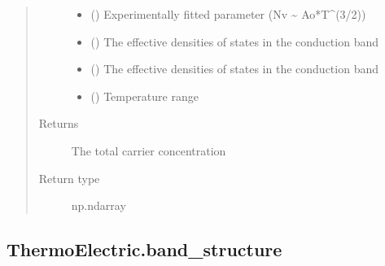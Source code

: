 \documentclass[letterpaper,10pt,english]{sphinxmanual}
\begin{document}
\begin{fulllineitems}
\begin{quote}
\begin{description}
\begin{itemize}
\item {} 
\sphinxAtStartPar
{} () \textendash{} Experimentally fitted parameter (Nv \textasciitilde{} Ao*T\textasciicircum{}(3/2))

\item {} 
\sphinxAtStartPar
{} () \textendash{} The effective densities of states in the conduction band

\item {} 
\sphinxAtStartPar
{} () \textendash{} The effective densities of states in the conduction band

\item {} 
\sphinxAtStartPar
{} () \textendash{} Temperature range

\end{itemize}

\item[{Returns}] \leavevmode
\sphinxAtStartPar
{} \textendash{} The total carrier concentration

\item[{Return type}] \leavevmode
\sphinxAtStartPar
np.ndarray

\end{description}\end{quote}

\end{fulllineitems}



\subsection{ThermoElectric.band\_structure}
\label{\detokenize{autosummary/ThermoElectric.band_structure:thermoelectric-band-structure}}\label{\detokenize{autosummary/ThermoElectric.band_structure::doc}}
\end{document}
